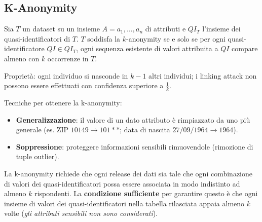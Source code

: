 \documentclass[a4paper,11pt]{article}
\begin{document}
\subsection{K-Anonymity}

\begin{definizione}
Sia $T$ un dataset su un insieme $A = a_1, \ldots, a_n$ di attributi e $QI_T$ l'insieme dei quasi-identificatori di $T$. $T$ soddisfa la $k$-anonymity se e solo se per ogni quasi-identificatore $QI \in QI_T$, ogni sequenza esistente di valori attribuita a $QI$ compare almeno con $k$ occorrenze in $T$.

Propriet\`{a}: ogni individuo si nasconde in $k-1$ altri individui; i linking attack non possono essere effettuati con confidenza superiore a $\frac{1}{k}$.
\end{definizione}

Tecniche per ottenere la k-anonymity:
\begin{itemize}
  \item \textbf{Generalizzazione}: il valore di un dato attributo \`{e} rimpiazzato da uno pi\`{u} generale (es. ZIP $10149 \to 101**$; data di nascita $27/09/1964 \to 1964$).
  \item \textbf{Soppressione}: proteggere informazioni sensibili rimuovendole (rimozione di tuple outlier).
\end{itemize}

La k-anonymity richiede che ogni release dei dati sia tale che ogni combinazione di valori dei quasi-identificatori possa essere associata in modo indistinto ad almeno $k$ rispondenti. La \textbf{condizione sufficiente} per garantire questo \`{e} che ogni insieme di valori dei quasi-identificatori nella tabella rilasciata appaia almeno $k$ volte (\emph{gli attributi sensibili non sono considerati}).
\end{document}
